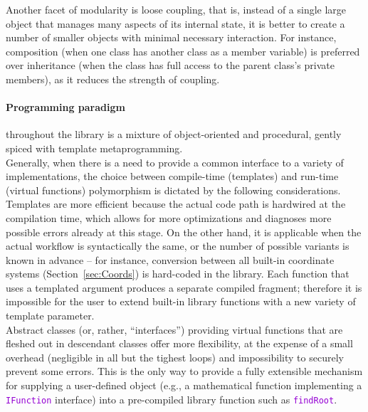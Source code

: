 \documentclass[12pt]{article}
\newcommand{\ttt}[1]{\textcolor{darkviolet}{\texttt{#1}}}
\begin{document}
Another facet of modularity is loose coupling, that is, instead of a single large object that manages many aspects of its internal state, it is better to create a number of smaller objects with minimal necessary interaction. For instance, composition (when one class has another class as a member variable) is preferred over inheritance (when the class has full access to the parent class's private members), as it reduces the strength of coupling.

\paragraph{Programming paradigm} throughout the library is a mixture of object-oriented and procedural, gently spiced with template metaprogramming.\\
Generally, when there is a need to provide a common interface to a variety of implementations, the choice between compile-time (templates) and run-time (virtual functions) polymorphism is dictated by the following considerations.\\
Templates are more efficient because the actual code path is hardwired at the compilation time, which allows for more optimizations and diagnoses more possible errors already at this stage. On the other hand, it is applicable when the actual workflow is syntactically the same, or the number of possible variants is known in advance -- for instance, conversion between all built-in coordinate systems (Section~\ref{sec:Coords}) is hard-coded in the library. Each function that uses a templated argument produces a separate compiled fragment; therefore it is impossible for the user to extend built-in library functions with a new variety of template parameter.\\
Abstract classes (or, rather, ``interfaces'') providing virtual functions that are fleshed out in descendant classes offer more flexibility, at the expense of a small overhead (negligible in all but the tighest loops) and impossibility to securely prevent some errors. This is the only way to provide a fully extensible mechanism for supplying a user-defined object (e.g., a mathematical function implementing a \ttt{IFunction} interface) into a pre-compiled library function such as \ttt{findRoot}.
\end{document}
